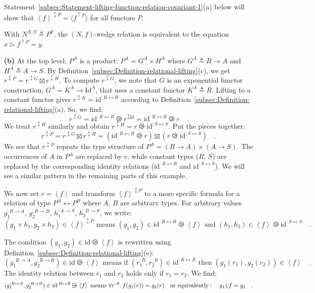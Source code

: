 Statement~\ref{subsec:Statement-lifting-function-relation-covariant-1}(a)
below will show that $\left<f\right>^{\updownarrow P}=\langle f^{\uparrow P}\rangle$
for all functors $P$.

With $N^{X,Y}\triangleq P^{Y}$, the $\left(N,f\right)$-wedge relation
is equivalent to the equation $x\triangleright f^{\uparrow P}=y$.

\textbf{(b)} At the top level, $P^{A}$ is a product: $P^{A}=G^{A}\times H^{A}$
where $G^{A}\triangleq R\rightarrow A$ and $H^{A}\triangleq A\rightarrow S$.
By Definition~\ref{subsec:Definition-relational-lifting}(c), we
get $r^{\updownarrow P}=r^{\updownarrow G}\boxtimes r^{\updownarrow H}$.
To compute $r^{\updownarrow G}$, we note that $G$ is an exponential
functor construction, $G^{A}=K^{A}\rightarrow\text{Id}^{A}$, that
uses a constant functor $K^{A}\triangleq R$. Lifting to a constant
functor gives $r^{\updownarrow K}=\text{id}^{:R\leftrightarrow R}$
according to Definition~\ref{subsec:Definition-relational-lifting}(a).
So, we find:
\[
r^{\updownarrow G}=\text{id}^{:R\leftrightarrow R}\ogreaterthan r^{\updownarrow\text{Id}}=\text{id}^{:R\leftrightarrow R}\ogreaterthan r\quad.
\]
We treat $r^{\updownarrow H}$ similarly and obtain $r^{\updownarrow H}=r\ogreaterthan\text{id}^{:S\leftrightarrow S}$.
Put the pieces together:
\[
r^{\updownarrow P}=r^{\updownarrow G}\boxtimes r^{\updownarrow H}=(\text{id}^{:R\leftrightarrow R}\ogreaterthan r)\boxtimes(r\ogreaterthan\text{id}^{:S\leftrightarrow S})\quad.
\]
We see that $r^{\updownarrow P}$ repeats the type structure of $P^{A}=(R\rightarrow A)\times(A\rightarrow S)$.
The occurrences of $A$ in $P^{A}$ are replaced by $r$, while constant
types ($R$, $S$) are replaced by the corresponding identity relations
($\text{id}^{:R\leftrightarrow R}$ and $\text{id}^{:S\leftrightarrow S}$).
We will see a similar pattern in the remaining parts of this example.

We now set $r=\left<f\right>$ and transform $\left<f\right>^{\updownarrow P}$
to a more specific formula for a relation of type $P^{A}\leftrightarrow P^{B}$
where $A$, $B$ are arbitrary types. For arbitrary values $g_{1}^{:R\rightarrow A}$,
$g_{2}^{:R\rightarrow B}$, $h_{1}^{:A\rightarrow S}$, $h_{2}^{:B\rightarrow S}$,
we write:
\[
(g_{1}\times h_{1},g_{2}\times h_{2})\in\left<f\right>^{\updownarrow P}\text{ means }(g_{1},g_{2})\in\text{id}^{:R\leftrightarrow R}\ogreaterthan\left<f\right>\text{ and }(h_{1},h_{2})\in\left<f\right>\ogreaterthan\text{id}^{:S\leftrightarrow S}\quad.
\]

The condition $(g_{1},g_{2})\in\text{id}\ogreaterthan\left<f\right>$
is rewritten using Definition~\ref{subsec:Definition-relational-lifting}(e):
\[
(g_{1}^{:R\rightarrow A},g_{2}^{:R\rightarrow B})\in\text{id}\ogreaterthan\left<f\right>\text{ means if }(r_{1}^{:R},r_{2}^{:R})\in\text{id}^{:R\leftrightarrow R}\text{ then }(g_{1}(r_{1}),g_{2}(r_{2}))\in\left<f\right>\quad.
\]
The identity relation between $r_{1}$ and $r_{2}$ holds only if
$r_{1}=r_{2}$. We find:
\[
(g_{1}^{:R\rightarrow A},g_{2}^{:R\rightarrow B})\in\text{id}^{:R\leftrightarrow R}\ogreaterthan\left<f\right>\text{ means }\forall r^{:R}.\,f(g_{1}(r))=g_{2}(r)\quad\text{or equivalently}:\quad g_{1}\bef f=g_{2}\quad.
\]

